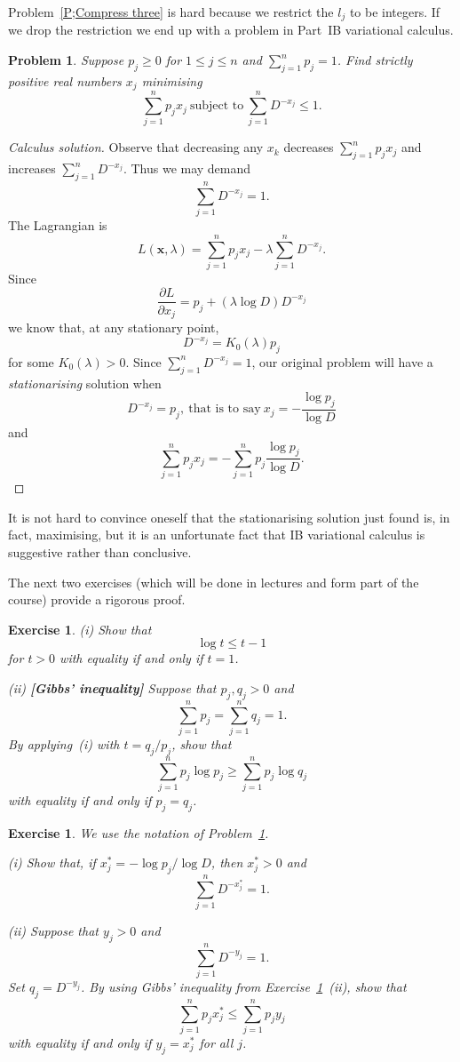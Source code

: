 \documentclass[12pt,a4paper]{article}
\theoremstyle{plain}
\newtheorem{exercise}[theorem]{Exercise}
\newtheorem{problem}[theorem]{Problem}
\theoremstyle{definition}
\begin{document}
Problem~\ref{P;Compress three} is hard because
we restrict the $l_{j}$ to be integers.
If we drop the restriction we end up with a problem
in Part~IB variational calculus.
\begin{problem}\label{P;Compress variation}
Suppose $p_{j}\geq 0$ for $1\leq j\leq n$ and $\sum_{j=1}^{n}p_{j}=1$.
Find strictly positive real numbers $x_{j}$ minimising
\[\sum_{j=1}^{n}p_{j}x_{j}\ \text{subject to} 
\ \sum_{j=1}^{n}D^{-x_{j}}\leq 1.\]
\end{problem}
\begin{proof}[Calculus solution] Observe 
that decreasing any $x_{k}$
decreases $\sum_{j=1}^{n}p_{j}x_{j}$
and increases $\sum_{j=1}^{n}D^{-x_{j}}$. Thus we may demand
\[\sum_{j=1}^{n}D^{-x_{j}}=1.\]
The Lagrangian is
\[L({\mathbf x},\lambda)=\sum_{j=1}^{n}p_{j}x_{j}
-\lambda\sum_{j=1}^{n}D^{-x_{j}}.\]
Since
\[\frac{\partial L}{\partial x_{j}}
=p_{j}+(\lambda\log D)D^{-x_{j}}\]
we know that, at any stationary point,
\[D^{-x_{j}}=K_{0}(\lambda)p_{j}\]
for some $K_{0}(\lambda)>0$. Since $\sum_{j=1}^{n}D^{-x_{j}}=1$,
our original problem will have a \emph{stationarising}
solution when
\[D^{-x_{j}}=p_{j},\ \text{that is to say}
\ x_{j}=-\frac{\log p_{j}}{\log D}\]
and
\[\sum_{j=1}^{n}p_{j}x_{j}=
-\sum_{j=1}^{n}p_{j}\frac{\log p_{j}}{\log D}.\]
\end{proof}
It is not hard to convince oneself that the  stationarising
solution just found is, in fact, maximising, but it is an
unfortunate fact that IB variational calculus is suggestive
rather than conclusive. 

The next two exercises 
(which will be done in lectures and form part of the course) 
provide a rigorous proof.
\begin{exercise}\label{E;Gibbs} (i) Show that
\[\log t\leq t-1\]
for $t>0$ with equality if and only if $t=1$.

(ii) {\bf [Gibbs' inequality]}
Suppose that $p_{j},q_{j}>0$ and 
\[\sum_{j=1}^{n}p_{j}=\sum_{j=1}^{n}q_{j}=1.\] 
By applying~(i) with $t=q_{j}/p_{j}$, show that
\[\sum_{j=1}^{n}p_{j}\log p_{j}\geq \sum_{j=1}^{n}p_{j}\log q_{j}\]
with equality if and only if $p_{j}=q_{j}$. 
\end{exercise}
\begin{exercise} We use the notation of 
Problem~\ref{P;Compress variation}.

(i) Show that, if $x_{j}^{*}=-\log p_{j}/\log D$, then
$x_{j}^{*}>0$ and
\[\sum_{j=1}^{n}D^{-x_{j}^{*}}=1.\]

(ii) Suppose that $y_{j}>0$ and
\[\sum_{j=1}^{n}D^{-y_{j}}=1.\]
Set $q_{j}=D^{-y_{j}}$. By using Gibbs' inequality
from Exercise~\ref{E;Gibbs}~(ii), show that
\[\sum_{j=1}^{n}p_{j}x_{j}^{*}\leq \sum_{j=1}^{n}p_{j}y_{j}\]
with equality if and only if $y_{j}=x_{j}^{*}$ for all $j$.
\end{exercise}
\end{document}
